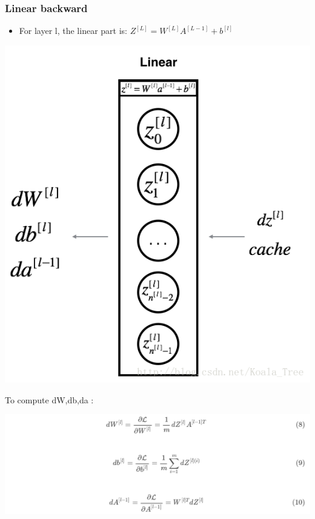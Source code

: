 \documentclass[12pt,a4paper]{article}
\begin{document}
			\subsubsection{Linear backward}
				\begin{itemize}
					\item For layer l, the linear part is: $Z^{[L]}=W^{[L]}A^{[L-1]}+b^{[l]}$\par
				\end{itemize}
		\qquad\qquad\qquad\qquad\qquad\includegraphics[scale=0.8]{image_7.png}\par
		To compute dW,db,da :\par
		\includegraphics[scale=0.6]{image_8.png}
		\newpage
\end{document}
